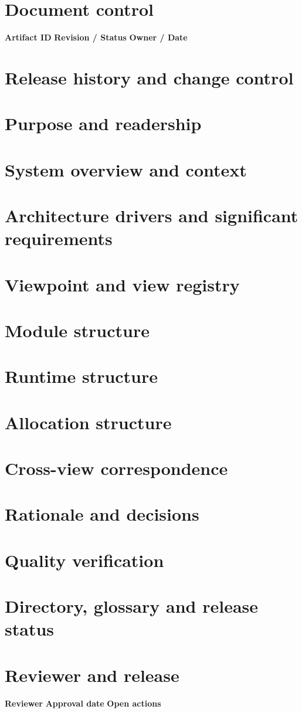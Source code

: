 \documentclass[10pt,letterpaper]{article}
\begin{document}
\DocProvenance
\section{Document control}
\textbf{Artifact ID}
\textbf{Revision / Status}
\textbf{Owner / Date}
\section{Release history and change control}
\section{Purpose and readership}
\section{System overview and context}
\section{Architecture drivers and significant requirements}
\section{Viewpoint and view registry}
\section{Module structure}
\section{Runtime structure}
\section{Allocation structure}
\section{Cross-view correspondence}
\section{Rationale and decisions}
\section{Quality verification}
\section{Directory, glossary and release status}
\section{Reviewer and release}
\textbf{Reviewer}
\textbf{Approval date}
\textbf{Open actions}
\end{document}
